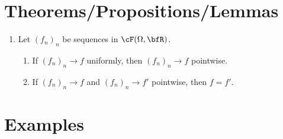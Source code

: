 \section*{Theorems/Propositions/Lemmas}
    \begin{enumerate}[label = (\arabic*)]
        \item Let $(f_n)_n$ be sequences in $\cF(\Omega,\bfR)$.
            \begin{enumerate}[label = (\roman*)]
                \item If $(f_n)_n \rightarrow f$ uniformly, then $(f_n)_n \rightarrow f$ pointwise.
                \item If $(f_n)_n \rightarrow f$ and $(f_n)_n \rightarrow f'$ pointwise, then $f = f'$.
            \end{enumerate}
    \end{enumerate}
\section*{Examples}